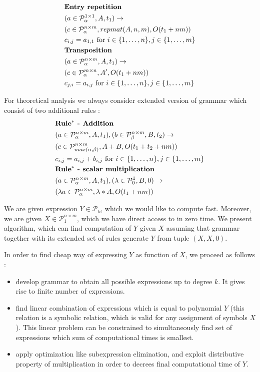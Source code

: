 \documentclass{article}
\begin{document}
\begin{align*}
&\text{{\bf Entry repetition}}\\
&(a \in \mathcal{P}^{1 \times 1}_\alpha, A, t_1) \rightarrow \\ 
&(c \in \mathcal{P}^{n \times m}_\alpha, repmat(A, n, m), O(t_1 + nm)) \\
&c_{i, j} = a_{1, 1} \text{ for } i \in \{1, \dots, n\}, j \in \{1, \dots, m\}\\
&\text{{\bf Transposition}}\\
&(a \in \mathcal{P}^{n \times m}_\alpha, A, t_1) \rightarrow \\ 
&(c \in \mathcal{P}^{m \times n}_\alpha, A', O(t_1 + nm)) \\
&c_{j, i} = a_{i, j} \text{ for } i \in \{1, \dots, n\}, j \in \{1, \dots, m\} \\
\end{align*}

For theoretical analysis we always consider extended version of grammar which consist of two additional rules : 
\begin{align*}
&\text{{\bf Rule$^*$ - Addition}}\\
&(a \in \mathcal{P}^{n \times m}_\alpha, A, t_1), (b \in \mathcal{P}^{n \times m}_\beta, B, t_2) \rightarrow \\ 
&(c \in \mathcal{P}^{n \times m}_{max(\alpha, \beta)}, A + B, O(t_1 + t_2 + nm)) \\
&c_{i,j} = a_{i,j} + b_{i, j} \text{ for } i \in \{1, \dots, n\}, j \in \{1, \dots, m\} \\
&\text{{\bf Rule$^*$ - scalar multiplication}}\\
&(a \in \mathcal{P}^{n \times m}_\alpha, A, t_1), (\lambda \in \mathcal{P}^{1}_0, B, 0) \rightarrow \\ 
&(\lambda a \in \mathcal{P}^{n \times m}_{\alpha}, \lambda * A, O(t_1 + nm)) \\
\end{align*}

We are given expression $Y \in \mathcal{P}_k$, which we would like to compute fast. Moreover, we are given $X \in \mathcal{P}^{n \times m}_1$, which
we have direct access to in zero time. We present algorithm, which can find computation of $Y$ given $X$ assuming that grammar together with its extended set of rules
generate $Y$ from tuple $(X, X, 0)$.

In order to find cheap way of expressing $Y$ as function of $X$, we proceed as follows : 
\begin{itemize}
\item develop grammar to obtain all possible expressions up to degree $k$. It gives rise to finite number of expressions.
\item find linear combination of expressions which is equal to polynomial $Y$ (this relation is a symbolic relation, which is valid for any assignment of symbols $X$). This linear problem can be constrained to simultaneously find set of expressions which sum of computational times is smallest.
\item apply optimization like subexpression elimination, and exploit distributive property of multiplication in order to decrees final computational time of $Y$.
\end{itemize}
\end{document}
